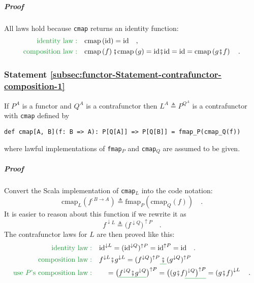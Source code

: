 \subparagraph{Proof}

All laws hold because \lstinline!cmap! returns an identity function:
\begin{align*}
{\color{greenunder}\text{identity law}:}\quad & \text{cmap}\left(\text{id}\right)=\text{id}\quad,\\
{\color{greenunder}\text{composition law}:}\quad & \text{cmap}\left(f\right)\bef\text{cmap}\left(g\right)=\text{id}\bef\text{id}=\text{id}=\text{cmap}\left(g\bef f\right)\quad.
\end{align*}


\subsubsection{Statement \label{subsec:functor-Statement-contrafunctor-composition-1}\ref{subsec:functor-Statement-contrafunctor-composition-1}}

If $P^{A}$ is a functor and $Q^{A}$ is a contrafunctor then $L^{A}\triangleq P^{Q^{A}}$
is a contrafunctor with \lstinline!cmap! defined by
\begin{lstlisting}
def cmap[A, B](f: B => A): P[Q[A]] => P[Q[B]] = fmap_P(cmap_Q(f))
\end{lstlisting}
where lawful implementations of \lstinline!fmap!$_{P}$ and \lstinline!cmap!$_{Q}$
are assumed to be given.

\subparagraph{Proof}

Convert the Scala implementation of \lstinline!cmap!$_{L}$ into
the code notation:
\[
\text{cmap}_{L}(f^{:B\rightarrow A})\triangleq\text{fmap}_{P}(\text{cmap}_{Q}(f))\quad.
\]
It is easier to reason about this function if we rewrite it as
\[
f^{\downarrow L}\triangleq\big(f^{\downarrow Q}\big)^{\uparrow P}\quad.
\]
The contrafunctor laws for $L$ are then proved like this:
\begin{align*}
{\color{greenunder}\text{identity law}:}\quad & \text{id}^{\downarrow L}=(\text{id}^{\downarrow Q})^{\uparrow P}=\text{id}^{\uparrow P}=\text{id}\quad.\\
{\color{greenunder}\text{composition law}:}\quad & f^{\downarrow L}\bef g^{\downarrow L}=(f^{\downarrow Q})^{\uparrow P}\gunderline{\,\bef\,}(g^{\downarrow Q})^{\uparrow P}\\
{\color{greenunder}\text{use }P\text{\textsf{'}s composition law}:}\quad & \quad=\big(\gunderline{f^{\downarrow Q}\bef g^{\downarrow Q}}\big)^{\uparrow P}=\big((g\bef f\gunderline{)^{\downarrow Q}\big)^{\uparrow P}}=\left(g\bef f\right)^{\downarrow L}\quad.
\end{align*}

